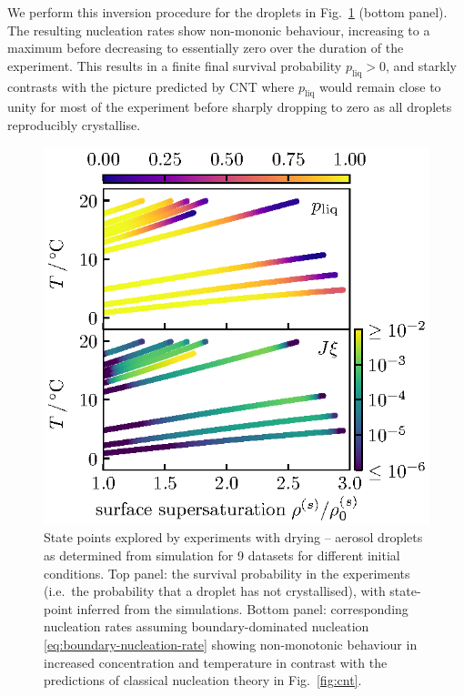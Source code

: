 \documentclass[11pt,twoside]{report}
\begin{document}
We perform this inversion procedure for the  droplets in Fig.\ \ref{fig:state-points} (bottom panel).
The resulting nucleation rates show non-mononic behaviour, increasing to a maximum before decreasing to essentially zero over the duration of the experiment.
This results in a finite final survival probability $p_\mathrm{liq} > 0$, and starkly contrasts with the picture predicted by CNT where $p_\mathrm{liq}$ would remain close to unity for most of the experiment before sharply dropping to zero as all droplets reproducibly crystallise.

\begin{figure}
  \includegraphics[width=0.9\linewidth,outer]{nano3-nucleation-rates}
  \caption[Experimentally observed nucleation rates in  droplets]{
    State points explored by experiments with drying -- aerosol droplets as determined from simulation for 9 datasets for different initial conditions.
    Top panel: the survival probability in the experiments (i.e.\ the probability that a droplet has not crystallised), with state-point inferred from the simulations.
    Bottom panel: corresponding nucleation rates assuming boundary-dominated nucleation \eqref{eq:boundary-nucleation-rate} showing non-monotonic behaviour in increased concentration and temperature in contrast with the predictions of classical nucleation theory in Fig.\ \ref{fig:cnt}.}
  \label{fig:state-points}
\end{figure}
\end{document}
